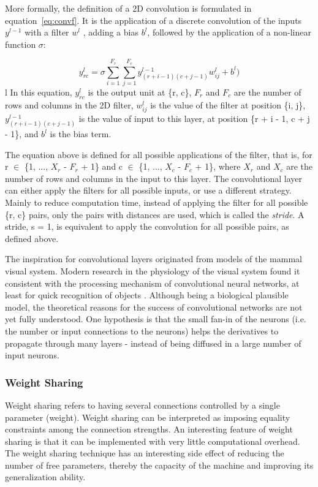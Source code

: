 \noindent More formally, the definition of a 2D convolution is formulated in equation~\ref{eq:convf}. It is the
application of a discrete convolution of the inputs $y^{l-1}$ with a filter $w^{l}$ , adding a bias $b^{l}$, followed by the application of a non-linear function $\sigma$:

\begin{equation}
y_{rc}^{l} =  \sigma \sum_{i=1}^{F_r}\sum_{j=1}^{F_c}  y_{(r+i-1)(c+j-1)}^{l-1} w_{ij}^{l} + b^{l})
\label{eq:convf}
\end{equation}
l
In this equation, $y_{rc}^{l}$ is the output unit at \{r, c\}, $F_r$ and $F_c$ are the number of rows and columns in the 2D filter, $w_{ij}^{l}$ is the value of the filter at position \{i, j\},  $y_{(r+i-1)(c+j-1)}^{l-1}$ is the value of input to this layer, at position \{r + i - 1, c + j - 1\}, and $b^{l}$ is the bias term.

The equation above is defined for all possible applications of the filter, that is, for r $\in$ \{1, ..., $X_r$ - $F_r$ + 1\} and c $\in$ \{1, ..., $X_c$ - $F_c$ + 1\}, where $X_r$ and $X_c$ are the number of rows and columns in the input to this layer. The convolutional layer can either apply the filters for all possible inputs, or use a different strategy. Mainly to reduce computation time, instead of applying the filter for all possible \{r, c\} pairs, only the pairs with distances are used, which is called the \textit{stride}. A stride, s = 1, is equivalent to apply the convolution for all possible pairs, as defined above. 

\noindent The inspiration for convolutional layers originated from models of the mammal visual system. Modern research in the physiology of the visual system found it consistent with the processing mechanism of convolutional neural networks, at least for quick recognition of objects \cite{bengio2009learning}. Although being a biological plausible model, the theoretical reasons for the success of convolutional networks are not yet fully understood. One hypothesis is that the small fan-in of the neurons (i.e. the number or input connections to the neurons) helps the derivatives to propagate through many layers - instead of being diffused in a large number of input neurons.

\subsubsection{Weight Sharing}

Weight sharing refers to having several connections controlled by a single parameter (weight). Weight sharing can be interpreted as imposing equality constraints among the connection strengths. An interesting feature of weight sharing is that it can be implemented with very little computational overhead\cite{lecun1989generalization}. The weight sharing technique has an interesting side effect of reducing the number of free parameters, thereby the capacity of the machine and improving its generalization ability\cite{lecun2010convolutional}.



